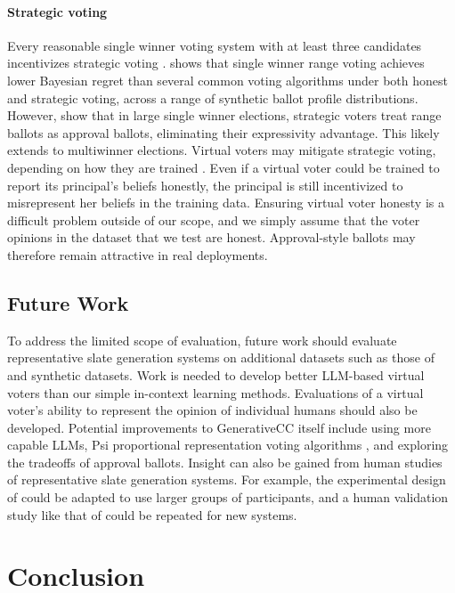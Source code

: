 \documentclass[letterpaper]{article} %
\begin{document}
\paragraph{Strategic voting}
Every reasonable single winner voting system with at least three candidates incentivizes strategic voting \citep{gibbards-theorem}.
\citet{rangevoting-range-voting} shows that single winner range voting achieves lower Bayesian regret than several common voting algorithms under both honest and strategic voting, across a range of synthetic ballot profile distributions.
However, \citet{preference-overstating} show that in large single winner elections, strategic voters treat range ballots as approval ballots, eliminating their expressivity advantage.
This likely extends to multiwinner elections.
Virtual voters may mitigate strategic voting, depending on how they are trained \citet{rangevoting-range-voting, newberry-moral-parliaments}.
Even if a virtual voter could be trained to report its principal's beliefs honestly, the principal is still incentivized to misrepresent her beliefs in the training data.
Ensuring virtual voter honesty is a difficult problem outside of our scope, and we simply assume that the voter opinions in the dataset that we test are honest.
Approval-style ballots may therefore remain attractive in real deployments.


\subsection{Future Work}

To address the limited scope of evaluation, future work should evaluate representative slate generation systems on additional datasets such as those of \citet{gsc-next-gen} and synthetic datasets.
Work is needed to develop  better LLM-based virtual voters than our simple in-context learning methods.
Evaluations of a virtual voter's ability to represent the opinion of individual humans should also be developed.
Potential improvements to GenerativeCC itself include using more capable LLMs, Psi proportional representation voting algorithms \citep{rangevoting-optimal-pr}, and exploring the tradeoffs of approval ballots.
Insight can also be gained from human studies of representative slate generation systems.
For example, the experimental design of \citet{habermas-machine} could be adapted to use larger groups of participants, and a human validation study like that of \citet{fish-v2} could be repeated for new systems.

\section{Conclusion}
\end{document}
